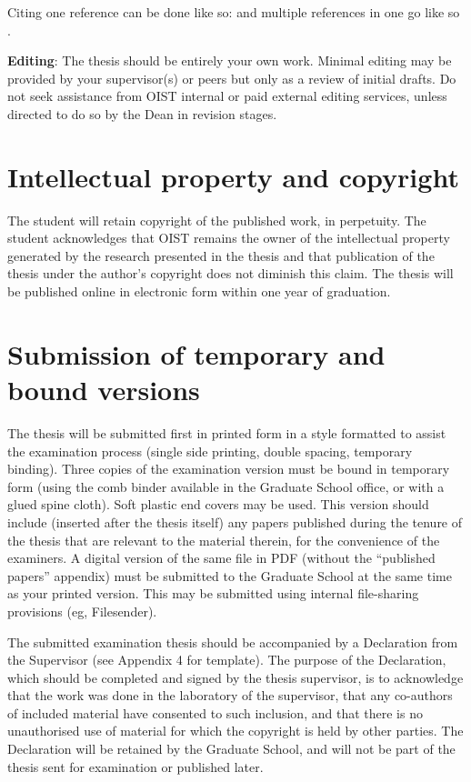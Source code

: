 Citing one reference can be done like so: \cite{Lee98} and multiple references in one go like so \cite{Fil09, Muc10, Kra27}.

\textbf{Editing}:  The thesis should be entirely your own work. Minimal editing may be provided by your supervisor(s) or peers but only as a review of initial drafts.  Do not seek assistance from OIST internal or paid external editing services, unless directed to do so by the Dean in revision stages.

\section{Intellectual property and copyright}

The student will retain copyright of the published work, in perpetuity.  The student acknowledges that OIST remains the owner of the intellectual property generated by the research presented in the thesis and that publication of the thesis under the author's copyright does not diminish this claim.  The thesis will be published online in electronic form within one year of graduation.


 \section{Submission of temporary and bound versions}

The thesis will be submitted first in printed form in a style formatted to assist the examination process (single side printing, double spacing, temporary binding).  Three copies of the examination version must be bound in temporary form (using the comb binder available in the Graduate School office, or with a glued spine cloth).  Soft plastic end covers may be used. This version should include (inserted after the thesis itself) any papers published during the tenure of the thesis that are relevant to the material therein, for the convenience of the examiners.  A digital version of the same file in PDF (without the ``published papers'' appendix) must be submitted to the Graduate School at the same time as your printed version.  This may be submitted using internal file-sharing provisions (eg, Filesender).

The submitted examination thesis should be accompanied by a Declaration from the Supervisor (see Appendix 4 for template).  The purpose of the Declaration, which should be completed and signed by the thesis supervisor, is to acknowledge that the work was done in the laboratory of the supervisor, that any co-authors of included material have consented to such inclusion, and that there is no unauthorised use of material for which the copyright is held by other parties.  The Declaration  will be retained by the Graduate School, and will not be part of the thesis sent for examination or published later.

